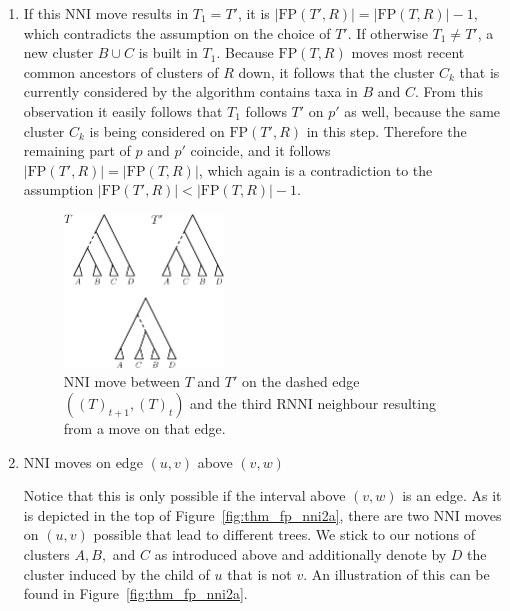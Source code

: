\documentclass{amsart}
\newcommand{\rnni}{\mathrm{RNNI}}
\newcommand{\nni}{\mathrm{NNI}}
\newcommand{\fp}{\mathrm{FP}}
\begin{document}
\begin{enumerate}[{Case} (1).]
\item If this $\nni$ move results in $T_1 = T'$, it is $|\fp(T',R)| = |\fp(T,R)| - 1$, which contradicts the assumption on the choice of $T'$.
If otherwise $T_1 \neq T'$, a new cluster $B \cup C$ is built in $T_1$.
Because $\fp(T,R)$ moves most recent common ancestors of clusters of $R$ down, it follows that the cluster $C_k$ that is currently considered by the algorithm contains taxa in $B$ and $C$.
From this observation it easily follows that $T_1$ follows $T'$ on $p'$ as well, because the same cluster $C_k$ is being considered on $\fp(T',R)$ in this step.
Therefore the remaining part of $p$ and $p'$ coincide, and it follows $|\fp(T',R)| = |\fp(T,R)|$, which again is a contradiction to the assumption $|\fp(T',R)| < |\fp(T,R)| - 1$.

\begin{figure}[!hbt]
\centering
\includegraphics[width=0.4\textwidth]{thm_fp_nni1}
\vspace{12pt}
\caption{$\nni$ move between $T$ and $T'$ on the dashed edge $((T)_{t+1},(T)_t)$ and the third $\rnni$ neighbour resulting from a move on that edge.}
\label{fig:thm_fp_nni1}
\end{figure}

\item $\nni$ moves on edge $(u,v)$ above $(v,w)$

Notice that this is only possible if the interval above $(v,w)$ is an edge.
As it is depicted in the top of Figure~\ref{fig:thm_fp_nni2a}, there are two $\nni$ moves on $(u,v)$ possible that lead to different trees.
We stick to our notions of clusters $A,B,$ and $C$ as introduced above and additionally denote by $D$ the cluster induced by the child of $u$ that is not $v$.
An illustration of this can be found in Figure~\ref{fig:thm_fp_nni2a}.


\end{enumerate}
\end{document}
